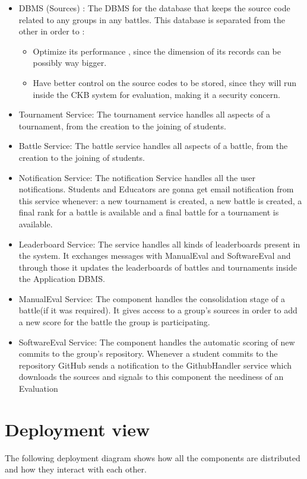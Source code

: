 \begin{itemize}
\item DBMS (Sources) : The DBMS for the database that keeps the source code related to any groups in any battles. This database is separated from the other in order to :
\begin{itemize}
    \item Optimize its performance , since the dimension of its records can be possibly way bigger.
    \item Have better control on the source codes to be stored, since they will run inside the \ac{CKB} system for evaluation, making it a security concern.
\end{itemize}
\item Tournament Service: The tournament service handles all aspects of a tournament, from the creation to the joining of students.
\item Battle Service: The battle service handles all aspects of a battle,  from the creation to the joining of students.
\item Notification Service: The notification Service handles all the user notifications. Students and Educators are gonna get email notification from this service whenever: a new tournament is created, a new battle is created, a final rank for a battle is available and a final battle for a tournament is available.
\item Leaderboard Service: The service handles all kinds of leaderboards present in the system. It exchanges messages with ManualEval and SoftwareEval and through those it updates the leaderboards of battles and tournaments inside the Application DBMS.
\item ManualEval Service: The component handles the consolidation stage of a battle(if it was required). It gives access to a group's sources in order to add a new score for the battle the group is participating.
\item SoftwareEval Service: The component handles the automatic scoring of new commits to the group's repository. Whenever a student commits to the repository GitHub sends a notification to the GithubHandler service which downloads the sources and signals to this component the neediness of an Evaluation
\end{itemize}
\newpage
\section{Deployment view}

The following deployment diagram shows how all the components are distributed and how they interact with each other.

